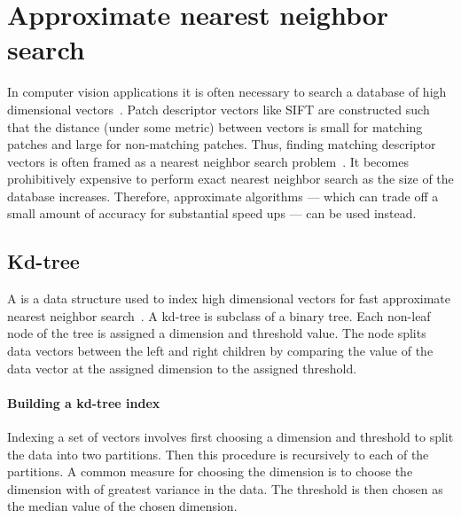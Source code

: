     \section{Approximate nearest neighbor search}\label{sec:ann}  

        In computer vision applications it is often necessary to search
          a database of high dimensional
          vectors~\cite{shakhnarovich_nearest_neighbor_2006,
          datar_locality_sensitive_2004, muja_fast_2009,
          kulis_kernelized_2012, weiss_spectral_2009}.
        Patch descriptor vectors like SIFT are constructed such that
          the distance (under some metric) between vectors is small for
          matching patches and large for non-matching patches.
        Thus, finding matching descriptor vectors is often framed as a
          nearest neighbor search problem~\cite{lowe_distinctive_2004}.
        It becomes prohibitively expensive to perform exact nearest
          neighbor search as the size of the database increases.
        Therefore, approximate algorithms --- which can trade off a
          small amount of accuracy for substantial speed ups --- can be
          used instead.

        \subsection{Kd-tree}

            A  is a data structure used to index
              high dimensional vectors for fast approximate nearest
              neighbor search~\cite{bentley_multidimensional_1975}.
            A kd-tree is subclass of a binary tree.
            Each non-leaf node of the tree is assigned a dimension and
              threshold value.
            The node splits data vectors between the left and right
              children by comparing the value of the data vector at the
              assigned dimension to the assigned threshold.

            \paragraph{Building a kd-tree index}
            Indexing a set of vectors involves first choosing a
              dimension and threshold to split the data into two
              partitions.
            Then this procedure is recursively to each of the
              partitions.
            A common measure for choosing the dimension is to choose
              the dimension with of greatest variance in the data.
            The threshold is then chosen as the median value of the
              chosen dimension.

